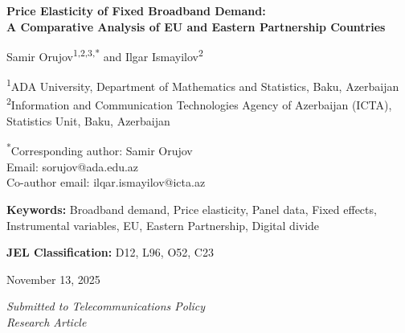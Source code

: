 \documentclass[12pt]{article}
\begin{document}
\thispagestyle{empty}

\begin{center}

\vspace*{2.5cm}

{\LARGE\bfseries Price Elasticity of Fixed Broadband Demand:\\
A Comparative Analysis of EU and Eastern Partnership Countries}

\vspace{2cm}

{\large
Samir Orujov\textsuperscript{1,2,3,*} \quad and \quad Ilgar Ismayilov\textsuperscript{2}\\
}

\vspace{1.5cm}

{\normalsize
\textsuperscript{1}ADA University, Department of Mathematics and Statistics, Baku, Azerbaijan\\
\vspace{0.3cm}
\textsuperscript{2}Information and Communication Technologies Agency of Azerbaijan (ICTA),\\
Statistics Unit, Baku, Azerbaijan\\
}

\vspace{1.5cm}

{\small
\textsuperscript{*}Corresponding author: Samir Orujov\\
Email: sorujov@ada.edu.az\\
\vspace{0.3cm}
Co-author email: ilqar.ismayilov@icta.az\\
}

\vspace{1.5cm}

{\small
\textbf{Keywords:} Broadband demand, Price elasticity, Panel data, Fixed effects,\\
Instrumental variables, EU, Eastern Partnership, Digital divide\\
}

\vspace{0.5cm}

{\small
\textbf{JEL Classification:} D12, L96, O52, C23\\
}

\vspace{2cm}

{\normalsize
November 13, 2025\\
}

\end{center}

\vfill

\begin{center}
{\footnotesize
\textit{Submitted to Telecommunications Policy}\\
\textit{Research Article}\\
}
\end{center}
\end{document}
